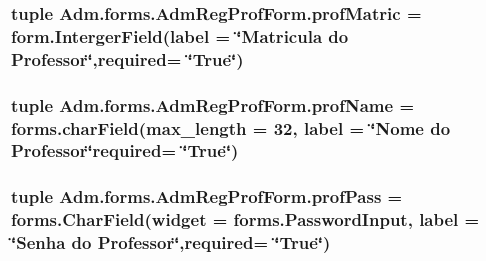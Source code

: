 \hypertarget{classAdm_1_1forms_1_1AdmRegProfForm_ac53b20321fbc980c896f534229c68ff1}{
\subsubsection[{prof\-Matric}]{\setlength{\rightskip}{0pt plus 5cm}tuple Adm.\-forms.\-Adm\-Reg\-Prof\-Form.\-prof\-Matric = form.\-Interger\-Field(label = \char`\"{}Matricula do Professor\char`\"{},required= \char`\"{}True\char`\"{})\hspace{0.3cm}{\ttfamily [static]}}}\label{classAdm_1_1forms_1_1AdmRegProfForm_ac53b20321fbc980c896f534229c68ff1}
\hypertarget{classAdm_1_1forms_1_1AdmRegProfForm_aec9f5746e7eb7f389c0f159780dd71fa}{
\subsubsection[{prof\-Name}]{\setlength{\rightskip}{0pt plus 5cm}tuple Adm.\-forms.\-Adm\-Reg\-Prof\-Form.\-prof\-Name = forms.\-char\-Field(max\-\_\-length = 32, label = \char`\"{}Nome do Professor\char`\"{}required= \char`\"{}True\char`\"{})\hspace{0.3cm}{\ttfamily [static]}}}\label{classAdm_1_1forms_1_1AdmRegProfForm_aec9f5746e7eb7f389c0f159780dd71fa}
\hypertarget{classAdm_1_1forms_1_1AdmRegProfForm_afe9e2e7368001ac81851ece8b42ccb57}{
\subsubsection[{prof\-Pass}]{\setlength{\rightskip}{0pt plus 5cm}tuple Adm.\-forms.\-Adm\-Reg\-Prof\-Form.\-prof\-Pass = forms.\-Char\-Field(widget = forms.\-Password\-Input, label = \char`\"{}Senha do Professor\char`\"{},required= \char`\"{}True\char`\"{})\hspace{0.3cm}{\ttfamily [static]}}}\label{classAdm_1_1forms_1_1AdmRegProfForm_afe9e2e7368001ac81851ece8b42ccb57}
